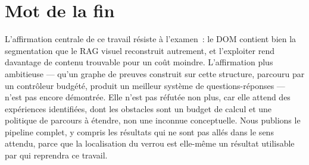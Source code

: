 \section*{Mot de la fin}

L'affirmation centrale de ce travail résiste à l'examen~: le DOM contient bien la
segmentation que le RAG visuel reconstruit autrement, et l'exploiter rend
davantage de contenu trouvable pour un coût moindre. L'affirmation plus ambitieuse
--- qu'un graphe de preuves construit sur cette structure, parcouru par un
contrôleur budgété, produit un meilleur système de questions-réponses --- n'est pas
encore démontrée. Elle n'est pas réfutée non plus, car elle attend des
expériences identifiées, dont les obstacles sont un budget de calcul et une
politique de parcours à étendre, non une inconnue conceptuelle. Nous publions le pipeline complet, y compris les résultats qui ne
sont pas allés dans le sens attendu, parce que la localisation du verrou est
elle-même un résultat utilisable par qui reprendra ce travail.
